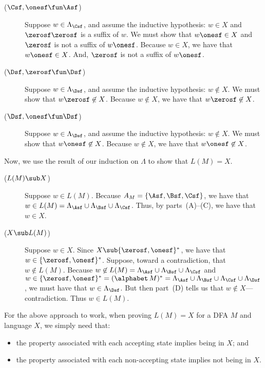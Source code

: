 \begin{description}
\item[\quad($\Csf, \onesf\fun\Asf$)] Suppose $w\in\Lambda_\Csf$, and
  assume the inductive hypothesis: $w\in X$ and $\zerosf\zerosf$ is a
  suffix of $w$.  We must show that $w\onesf\in X$ and $\zerosf$ is
  not a suffix of $w\onesf$.  Because $w\in X$, we have that
  $w\onesf\in X$.  And, $\zerosf$ is not a suffix of $w\onesf$.

\item[\quad($\Dsf, \zerosf\fun\Dsf$)] Suppose $w\in\Lambda_\Dsf$, and
  assume the inductive hypothesis: $w\not\in X$.  We must show that
  $w\zerosf\not\in X$.  Because $w\not\in X$, we have that
  $w\zerosf\not\in X$.

\item[\quad($\Dsf, \onesf\fun\Dsf$)] Suppose $w\in\Lambda_\Dsf$, and
  assume the inductive hypothesis: $w\not\in X$.  We must show that
  $w\onesf\not\in X$.   Because $w\not\in X$, we have that
  $w\onesf\not\in X$.
\end{description}

Now, we use the result of our induction on $\Lambda$ to show that
$L(M)=X$.

\begin{description}
\item[\quad($L(M)\sub X$)] Suppose $w\in L(M)$.  Because
  $A_M=\{\Asf,\Bsf,\Csf\}$, we have that $w\in L(M) = \Lambda_\Asf
  \cup \Lambda_\Bsf \cup \Lambda_\Csf$.  Thus, by parts~(A)--(C), we
  have that $w\in X$.

\item[\quad($X\sub L(M)$)] Suppose $w\in X$.  Since
  $X\sub\{\zerosf,\onesf\}^*$, we have that
  $w\in\{\zerosf,\onesf\}^*$.  Suppose, toward a contradiction, that
  $w\not\in L(M)$.  Because $w\not\in L(M) = \Lambda_\Asf \cup
  \Lambda_\Bsf \cup \Lambda_\Csf$ and $w\in\{\zerosf,\onesf\}^* =
  (\alphabet\,M)^* = \Lambda_\Asf \cup \Lambda_\Bsf \cup \Lambda_\Csf
  \cup \Lambda_\Dsf$, we must have that $w\in\Lambda_\Dsf$.  But then
  part~(D) tells us that $w\not\in X$---contradiction.  Thus $w\in
  L(M)$.
\end{description}

For the above approach to work, when proving $L(M)=X$ for a DFA $M$
and language $X$, we simply need that:
\begin{itemize}
\item the property associated with each accepting state implies
  being in $X$; and

\item the property associated with each non-accepting state implies
  not being in $X$.
\end{itemize}

